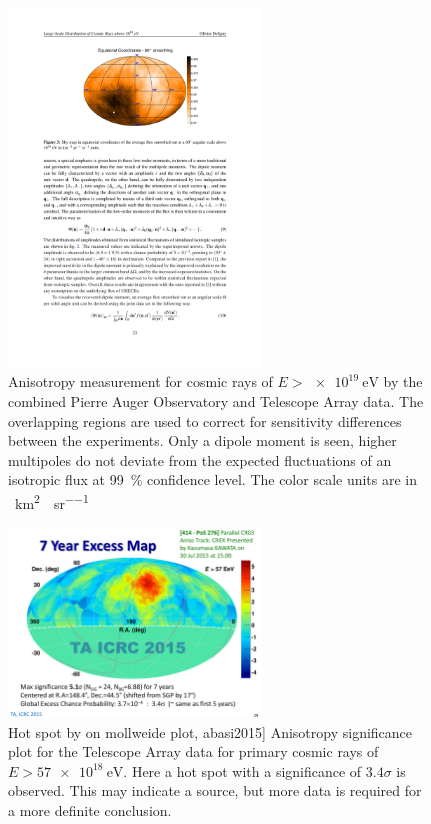 \begin{figure}
    \centering
    \includegraphics[width=0.6\textwidth]
                    {plots/cosmic-rays/skymap_ta_auger}
    \caption{Anisotropy measurement for cosmic rays of $E > \SI{e19}{\eV}$ by the combined Pierre Auger Observatory and Telescope Array data. The overlapping regions are used to correct for sensitivity differences between the experiments. Only a dipole moment is seen, higher multipoles do not deviate from the expected fluctuations of an isotropic flux at \SI{99}{\percent} confidence level. The color scale units are in \si{\per\kilo\meter\squared\per\year\per\steradian}}
    \label{fig:skymap_ta_auger}
\end{figure}

\begin{figure}
    \centering
    \includegraphics[width=0.6\textwidth]
                    {plots/cosmic-rays/hotspot_ta}
    \caption{Hot spot by \ta on mollweide plot, abasi2015]
Anisotropy significance plot for the Telescope Array data for primary cosmic rays of $E > \SI{57e18}{\eV}$. Here a hot spot with a significance of $3.4 \sigma$ is observed. This may indicate a source, but more data is required for a more definite conclusion.}
    \label{fig:hotspot_ta}
\end{figure}

